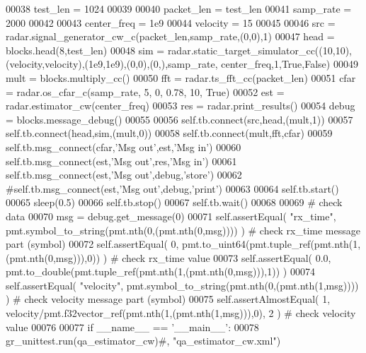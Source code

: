\begin{DoxyCode}
00038         test\_len = 1024
00039 
00040         packet\_len = test\_len
00041         samp\_rate = 2000
00042         
00043         center\_freq = 1e9
00044         velocity = 15
00045 
00046         src = radar.signal\_generator\_cw\_c(packet\_len,samp\_rate,(0,0),1)
00047         head = blocks.head(8,test\_len)
00048         sim = radar.static\_target\_simulator\_cc((10,10),(velocity,velocity),(1e9,1e9),(0,0),(0,),samp\_rate,
      center\_freq,1,\textcolor{keyword}{True},\textcolor{keyword}{False})
00049         mult = blocks.multiply\_cc()
00050         fft = radar.ts\_fft\_cc(packet\_len)
00051         cfar = radar.os\_cfar\_c(samp\_rate, 5, 0, 0.78, 10, \textcolor{keyword}{True})
00052         est = radar.estimator\_cw(center\_freq)
00053         res = radar.print\_results()
00054         debug = blocks.message\_debug()
00055 
00056         self.tb.connect(src,head,(mult,1))
00057         self.tb.connect(head,sim,(mult,0))
00058         self.tb.connect(mult,fft,cfar)
00059         self.tb.msg\_connect(cfar,\textcolor{stringliteral}{'Msg out'},est,\textcolor{stringliteral}{'Msg in'})
00060         self.tb.msg\_connect(est,\textcolor{stringliteral}{'Msg out'},res,\textcolor{stringliteral}{'Msg in'})
00061         self.tb.msg\_connect(est,\textcolor{stringliteral}{'Msg out'},debug,\textcolor{stringliteral}{'store'})
00062         \textcolor{comment}{#self.tb.msg\_connect(est,'Msg out',debug,'print')}
00063 
00064         self.tb.start()
00065         sleep(0.5)
00066         self.tb.stop()
00067         self.tb.wait()
00068         
00069         \textcolor{comment}{# check data}
00070         msg = debug.get\_message(0)
00071         self.assertEqual( \textcolor{stringliteral}{"rx\_time"}, pmt.symbol\_to\_string(pmt.nth(0,(pmt.nth(0,msg)))) ) \textcolor{comment}{# check rx\_time
       message part (symbol)}
00072         self.assertEqual( 0, pmt.to\_uint64(pmt.tuple\_ref(pmt.nth(1,(pmt.nth(0,msg))),0)) ) \textcolor{comment}{# check rx\_time
       value}
00073         self.assertEqual( 0.0, pmt.to\_double(pmt.tuple\_ref(pmt.nth(1,(pmt.nth(0,msg))),1)) )
00074         self.assertEqual( \textcolor{stringliteral}{"velocity"}, pmt.symbol\_to\_string(pmt.nth(0,(pmt.nth(1,msg)))) ) \textcolor{comment}{# check velocity
       message part (symbol)}
00075         self.assertAlmostEqual( 1, velocity/pmt.f32vector\_ref(pmt.nth(1,(pmt.nth(1,msg))),0), 2 ) \textcolor{comment}{# check
       velocity value}
00076 
00077 \textcolor{keywordflow}{if} \_\_name\_\_ == \textcolor{stringliteral}{'\_\_main\_\_'}:
00078     gr\_unittest.run(qa\_estimator\_cw)\textcolor{comment}{#, "qa\_estimator\_cw.xml")}
\end{DoxyCode}
